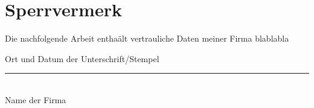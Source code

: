 
\thispagestyle{empty}

\section*{Sperrvermerk}
\vspace*{2em}

Die nachfolgende Arbeit enthaält vertrauliche Daten meiner Firma blablabla

\vspace{3em}

{\color{red}Ort und Datum der Unterschrift/Stempel}
\vspace{4em}

\rule{7cm}{0.4pt}\\
Name der Firma

